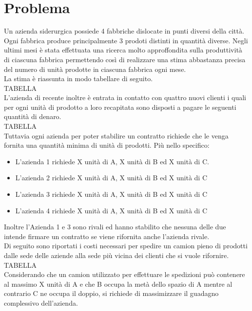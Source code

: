 \documentclass[12pt]{article}
\begin{document}
	

	\newpage
	
	\tableofcontents
	
	\newpage
	
	\section{Problema}
	Un azienda siderurgica possiede 4 fabbriche dislocate in punti diversi della città. Ogni fabbrica produce principalmente 3 prodoti distinti in quantità diverse.
	Negli ultimi mesi è stata effettuata una ricerca molto approffondita sulla produttività di ciascuna fabbrica permettendo così di realizzare una stima abbastanza precisa del numero di unità prodotte in ciascuna fabbrica ogni mese. \\
	La stima è riassunta in modo tabellare di seguito.\\
	TABELLA\\
	L'azienda di recente inoltre è entrata in contatto con quattro  nuovi clienti i quali per ogni unità di prodotto a loro recapitata sono disposti a pagare le seguenti quantità di denaro.\\
	TABELLA\\
	Tuttavia ogni azienda per poter stabilire un contratto richiede che le venga fornita una quantità minima di unità di prodotti. Più nello specifico:
	\begin{itemize}
		\item L'azienda 1 richiede X unità di A,  X unità di B ed X unità di C.
		\item L'azienda 2 richiede X unità di A,  X unità di B ed X unità di C
		\item L'azienda 3 richiede X unità di A,  X unità di B ed X unità di C
		\item L'azienda 4 richiede X unità di A,  X unità di B ed X unità di C
	\end{itemize}
	Inoltre l'Azienda 1 e 3 sono rivali ed hanno stabilito che nessuna delle due intende firmare un contratto se viene rifornita anche l'azienda rivale.\\
	Di seguito sono riportati i costi necessari per spedire un camion pieno di prodotti dalle sede delle aziende alla sede più vicina dei clienti che si vuole rifornire.\\
	TABELLA\\
	Considerando che un camion utilizzato per effettuare le spedizioni può contenere al massimo X unità di A e che B occupa la metà dello spazio di A mentre al contrario C ne occupa il doppio, si richiede di massimizzare il guadagno complessivo dell'azienda.
\end{document}
